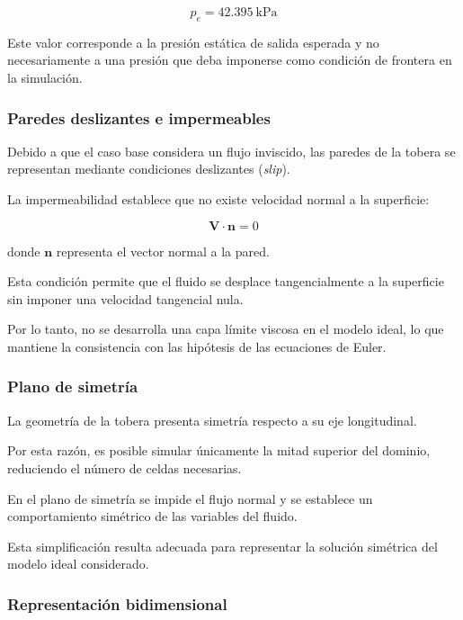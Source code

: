 \documentclass[12pt,letterpaper]{article}
\numberwithin{equation}{section}
\begin{document}
\begin{equation}
    p_e=42.395\ \mathrm{kPa}
\end{equation}

Este valor corresponde a la presión
estática de salida esperada y
no necesariamente a una presión
que deba imponerse como condición
de frontera en la simulación.


\subsubsection{Paredes deslizantes
e impermeables}

Debido a que el caso base
considera un flujo inviscido,
las paredes de la tobera
se representan mediante
condiciones deslizantes
(\textit{slip}).

La impermeabilidad establece
que no existe velocidad
normal a la superficie:

\begin{equation}
    \mathbf{V}\cdot\mathbf{n}=0
\end{equation}

donde $\mathbf{n}$ representa
el vector normal a la pared.

Esta condición permite que
el fluido se desplace
tangencialmente a la superficie
sin imponer una velocidad
tangencial nula.

Por lo tanto, no se desarrolla
una capa límite viscosa en
el modelo ideal, lo que
mantiene la consistencia con
las hipótesis de las
ecuaciones de Euler.


\subsubsection{Plano de simetría}

La geometría de la tobera
presenta simetría respecto
a su eje longitudinal.

Por esta razón, es posible
simular únicamente la mitad
superior del dominio,
reduciendo el número de
celdas necesarias.

En el plano de simetría
se impide el flujo normal
y se establece un comportamiento
simétrico de las variables
del fluido.

Esta simplificación resulta
adecuada para representar
la solución simétrica del
modelo ideal considerado.


\subsubsection{Representación bidimensional}
\end{document}
